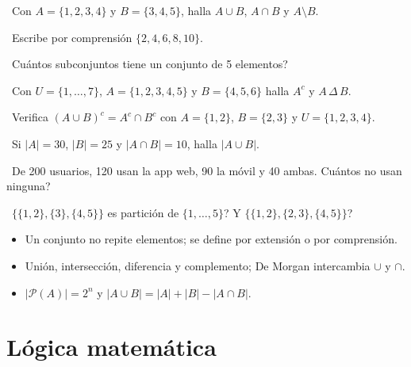 \begin{tmejercicios}
\label{ej:1-1}
\begin{tmlista}
\item \tmbasico\ Con $A=\{1, 2, 3, 4\}$ y $B=\{3, 4, 5\}$, halla $A\cup B$, $A\cap B$ y $A\setminus B$.
\item \tmbasico\ Escribe por comprensi\'on $\{2, 4, 6, 8, 10\}$.
\item \tmbasico\ \textquestiondown Cu\'antos subconjuntos tiene un conjunto de 5 elementos?
\item \tmmedio\ Con $U=\{1,\dots,7\}$, $A=\{1, 2, 3, 4, 5\}$ y $B=\{4, 5, 6\}$ halla $A^c$ y $A\,\Delta\,B$.
\item \tmmedio\ Verifica $(A\cup B)^c=A^c\cap B^c$ con $A=\{1, 2\}$, $B=\{2, 3\}$ y $U=\{1, 2, 3, 4\}$.
\item \tmmedio\ Si $|A|=30$, $|B|=25$ y $|A\cap B|=10$, halla $|A\cup B|$.
\item \tmdificil\ De 200 usuarios, 120 usan la app web, 90 la m\'ovil y 40 ambas. \textquestiondown Cu\'antos no usan ninguna?
\item \tmdificil\ \textquestiondown $\{\{1, 2\},\{3\},\{4, 5\}\}$ es partici\'on de $\{1,\dots,5\}$? \textquestiondown Y $\{\{1, 2\},\{2, 3\},\{4, 5\}\}$?
\end{tmlista}
\end{tmejercicios}


\begin{tmresumen}
\begin{itemize}
\item Un conjunto no repite elementos; se define por extensi\'on o por comprensi\'on.
\item Uni\'on, intersecci\'on, diferencia y complemento; De Morgan intercambia $\cup$ y $\cap$.
\item $|\mathcal P(A)|=2^n$ y $|A\cup B|=|A|+|B|-|A\cap B|$.
\end{itemize}
\end{tmresumen}

\section{L\'ogica matem\'atica}
\label{sec:1-2}

